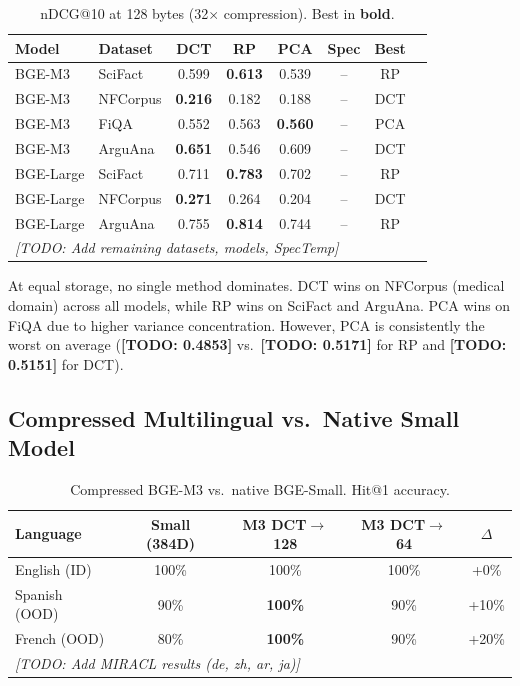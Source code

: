 \documentclass[sigconf]{acmart}
\begin{document}
\begin{table}[h]
\centering
\small
\caption{nDCG@10 at 128 bytes (32$\times$ compression). Best in \textbf{bold}.}
\label{tab:equal_storage}
\begin{tabular}{@{}llcccccc@{}}
\toprule
Model & Dataset & DCT & RP & PCA & Spec & Best \\
\midrule
BGE-M3 & SciFact & 0.599 & \textbf{0.613} & 0.539 & -- & RP \\
BGE-M3 & NFCorpus & \textbf{0.216} & 0.182 & 0.188 & -- & DCT \\
BGE-M3 & FiQA & 0.552 & 0.563 & \textbf{0.560} & -- & PCA \\
BGE-M3 & ArguAna & \textbf{0.651} & 0.546 & 0.609 & -- & DCT \\
BGE-Large & SciFact & 0.711 & \textbf{0.783} & 0.702 & -- & RP \\
BGE-Large & NFCorpus & \textbf{0.271} & 0.264 & 0.204 & -- & DCT \\
BGE-Large & ArguAna & 0.755 & \textbf{0.814} & 0.744 & -- & RP \\
\midrule
\multicolumn{7}{l}{\textit{[TODO: Add remaining datasets, models, SpecTemp]}} \\
\bottomrule
\end{tabular}
\end{table}

At equal storage, no single method dominates. DCT wins on NFCorpus (medical domain) across all models, while RP wins on SciFact and ArguAna. PCA wins on FiQA due to higher variance concentration. However, PCA is consistently the worst on average (\textbf{[TODO: 0.4853]} vs.\ \textbf{[TODO: 0.5171]} for RP and \textbf{[TODO: 0.5151]} for DCT).

\subsection{Compressed Multilingual vs.\ Native Small Model}\label{sec:multilingual}

\begin{table}[h]
\centering
\small
\caption{Compressed BGE-M3 vs.\ native BGE-Small. Hit@1 accuracy.}
\label{tab:multilingual}
\begin{tabular}{@{}lcccc@{}}
\toprule
Language & Small (384D) & M3 DCT$\to$128 & M3 DCT$\to$64 & $\Delta$ \\
\midrule
English (ID) & 100\% & 100\% & 100\% & +0\% \\
Spanish (OOD) & 90\% & \textbf{100\%} & 90\% & +10\% \\
French (OOD) & 80\% & \textbf{100\%} & 90\% & +20\% \\
\midrule
\multicolumn{5}{l}{\textit{[TODO: Add MIRACL results (de, zh, ar, ja)]}} \\
\bottomrule
\end{tabular}
\end{table}
\end{document}
